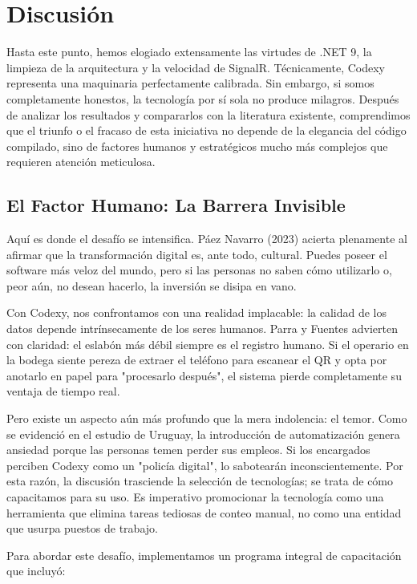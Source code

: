 \section{Discusión}

Hasta este punto, hemos elogiado extensamente las virtudes de .NET 9, la limpieza de la arquitectura y la velocidad de SignalR. Técnicamente, Codexy representa una maquinaria perfectamente calibrada. Sin embargo, si somos completamente honestos, la tecnología por sí sola no produce milagros. Después de analizar los resultados y compararlos con la literatura existente, comprendimos que el triunfo o el fracaso de esta iniciativa no depende de la elegancia del código compilado, sino de factores humanos y estratégicos mucho más complejos que requieren atención meticulosa.

\subsection{El Factor Humano: La Barrera Invisible}

Aquí es donde el desafío se intensifica. Páez Navarro (2023) acierta plenamente al afirmar que la transformación digital es, ante todo, cultural. Puedes poseer el software más veloz del mundo, pero si las personas no saben cómo utilizarlo o, peor aún, no desean hacerlo, la inversión se disipa en vano.

Con Codexy, nos confrontamos con una realidad implacable: la calidad de los datos depende intrínsecamente de los seres humanos. Parra y Fuentes advierten con claridad: el eslabón más débil siempre es el registro humano. Si el operario en la bodega siente pereza de extraer el teléfono para escanear el QR y opta por anotarlo en papel para "procesarlo después", el sistema pierde completamente su ventaja de tiempo real.

Pero existe un aspecto aún más profundo que la mera indolencia: el temor. Como se evidenció en el estudio de Uruguay, la introducción de automatización genera ansiedad porque las personas temen perder sus empleos. Si los encargados perciben Codexy como un "policía digital", lo sabotearán inconscientemente. Por esta razón, la discusión trasciende la selección de tecnologías; se trata de cómo capacitamos para su uso. Es imperativo promocionar la tecnología como una herramienta que elimina tareas tediosas de conteo manual, no como una entidad que usurpa puestos de trabajo.

Para abordar este desafío, implementamos un programa integral de capacitación que incluyó:

